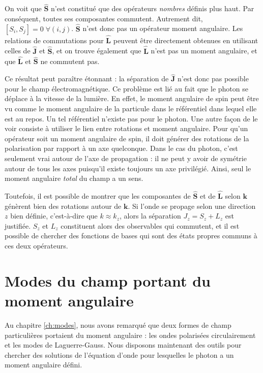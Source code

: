On voit que $\hat{\bm{S}}$ n'est constitué que des opérateurs \textit{nombres} définis plus haut. Par conséquent, toutes ses composantes commutent. Autrement dit, $[S_i,S_j] = 0 \;\forall(i,j)$. $\hat{\bm{S}}$ n'est donc pas un opérateur moment angulaire. Les relations de commutations pour $\hat{\bm{L}}$ peuvent être directement obtenues en utilisant celles de $\hat{\bm{J}}$ et $\hat{\bm{S}}$, et on trouve également que $\hat{\bm{L}}$ n'est pas un moment angulaire, et que $\hat{\bm{L}}$ et $\hat{\bm{S}}$ ne commutent pas. 

Ce résultat peut paraître étonnant : la séparation de $\hat{\bm{J}}$ n'est donc pas possible pour le champ électromagnétique. Ce problème est lié au fait que le photon se déplace à la vitesse de la lumière. En effet, le moment angulaire de spin peut être vu comme le moment angulaire de la particule dans le référentiel dans lequel elle est au repos. Un tel référentiel n'existe pas pour le photon. Une autre façon de le voir consiste à utiliser le lien entre rotations et moment angulaire. Pour qu'un opérateur soit un moment angulaire de spin, il doit générer des rotations de la polarisation par rapport à un axe quelconque. Dans le cas du photon, c'est seulement vrai autour de l'axe de propagation : il ne peut y avoir de symétrie autour de tous les axes puisqu'il existe toujours un axe privilégié. Ainsi, seul le moment angulaire \textit{total} du champ a un sens.

Toutefois, il est possible de montrer  que les composantes de $\hat{\bm{S}}$ et de $\hat{\bm{L}}$ selon $\bm{k}$ génèrent bien des rotations autour de $\bm{k}$. Si l'onde se propage selon une direction $z$ bien définie, c'est-à-dire que $k\approx k_z$, alors la séparation $J_z = S_z + L_z$ est justifiée. $S_z$ et $L_z$ constituent alors des observables qui commutent, et il est possible de chercher des fonctions de bases qui sont des états propres communs à ces deux opérateurs.

\chapter{Modes du champ portant du moment angulaire}
Au chapitre \ref{ch:modes}, nous avons remarqué que deux formes de champ particulières portaient du moment angulaire : les ondes polarisées circulairement et les modes de Laguerre-Gauss. Nous disposons maintenant des outils pour chercher des solutions de l'équation d'onde pour lesquelles le photon a un moment angulaire défini.

